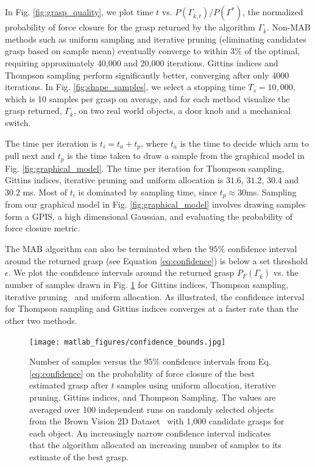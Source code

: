 \documentclass[10pt, conference]{ieeeconf}      %
\begin{document}
In Fig. \ref{fig:grasp_quality}, we plot time $t$ vs. $P(\Gamma_{\bar{k},t})$/$P(\Gamma^*)$, the normalized probability of force closure for the grasp returned by the algorithm $\Gamma_{\bar{k}}$.  Non-MAB methods such as uniform sampling and iterative pruning (eliminating candidates grasp based on sample mean) eventually converge to within 3$\%$ of the optimal, requiring approximately 40,000 and 20,000 iterations.  Gittins indices and Thompson sampling  perform significantly better, converging after only 4000 iterations. In Fig. \ref{fig:shape_samples}, we select a stopping time $T_s=10,000$, which is 10 samples per grasp on average, and for each method visualize the grasp  returned, $\Gamma_{\bar{k}}$, on two real world objects, a door knob and a mechanical switch. 

The time per iteration is $t_{i} = t_{a}+t_{p}$, where $t_{a}$ is the time to decide which arm to pull next and $t_{p}$ is the time taken to draw a sample from the graphical model in Fig. \ref{fig:graphical_model}. The time per iteration for Thompson sampling, Gittins indices, iterative pruning and uniform allocation is $31.6$, $31.2$, $30.4$ and $30.2$ ms. Most of $t_{i}$ is dominated by sampling time, since $t_{p} \approx 30$ms. Sampling from our graphical model in Fig. \ref{fig:graphical_model} involves drawing samples form a GPIS, a high dimensional Gaussian, and evaluating the probability of force closure metric. 

The MAB algorithm can also be terminated when the $95\%$ confidence interval around the returned grasp (see Equation \ref{eq:confidence}) is below a set threshold $\epsilon$. We plot the confidence intervals around the returned grasp $P_F(\Gamma_{\bar{k}})$ vs. the number of samples drawn in Fig. \ref{fig:confidence} for Gittins indices, Thompson sampling, iterative pruning~\cite{kehoe2012toward} and uniform allocation.  As illustrated, the confidence interval for Thompson sampling and Gittins indices converges at a faster rate than the other two methods. 


\begin{figure}[t!]
\centering
\texttt{[image: matlab\_figures/confidence\_bounds.jpg]}
\caption{ Number of samples versus the $95\%$ confidence intervals from Eq. \ref{eq:confidence} on the probability of force closure of the best estimated grasp after $t$ samples using uniform allocation, iterative pruning, Gittins indices, and Thompson Sampling. The values are averaged over 100 independent runs on randomly selected objects from the Brown Vision 2D Dataset~\cite{brown} with 1,000 candidate grasps for each object. An increasingly narrow confidence interval indicates that the algorithm allocated an increasing number of samples to its estimate of the best grasp. }

\vspace*{-10pt}
\label{fig:confidence}
\end{figure}
\end{document}
